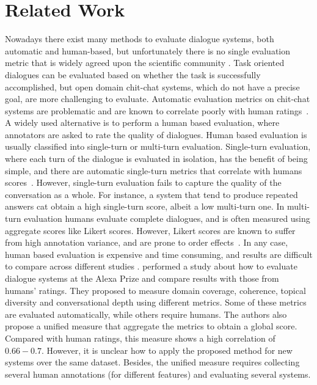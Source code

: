 \section{Related Work}
\label{sota}

Nowadays there exist many methods to evaluate dialogue systems, both automatic and human-based, but unfortunately there is no single evaluation metric that is widely agreed upon the scientific community \cite{deriu2019survey}. Task oriented dialogues can be evaluated based on whether the task is successfully accomplished, but open domain chit-chat systems, which do not have a precise goal, are more challenging to evaluate.
Automatic evaluation metrics on chit-chat systems are problematic and are known to correlate poorly with human ratings~\cite{liu-etal-2016-evaluate,lowe-etal-2017-towards}. 
A widely used alternative is to perform a human based evaluation, where annotators are asked to rate the quality of dialogues. Human based evaluation is usually classified into single-turn or multi-turn evaluation. Single-turn evaluation, where each turn of the dialogue is evaluated in isolation, has the benefit of being simple, and there are automatic single-turn metrics that correlate with humans scores~\cite{mehri2020usr}.
 However, single-turn evaluation fails to capture the quality of the conversation as a whole. For instance, a system that tend to produce repeated answers cat obtain a high single-turn score, albeit a low multi-turn one. In multi-turn evaluation humans evaluate complete dialogues, and is often measured using aggregate scores like Likert scores. 
However, Likert scores are known to suffer from high annotation variance, and are prone to order effects~\cite{amidei-etal-2019-use}. In any case, human based evaluation is expensive and time consuming, and results are difficult to compare across different studies \cite{van-der-lee-etal-2019-best,amidei2019agreement}. 
\citet{venkatesh2018evaluating} performed a study about how to evaluate dialogue systems at the Alexa Prize and compare results with those from humans' ratings. They proposed to measure domain coverage, coherence, topical diversity and conversational depth using different metrics. Some of these metrics are evaluated automatically, while others require humans. The authors also propose a unified measure that aggregate the metrics to obtain a global score. Compared with human ratings, this measure shows a high correlation of $0.66-0.7$. However, it is unclear how to apply the proposed method for new systems over the same dataset. Besides, the unified measure requires collecting several human annotations (for different features) and evaluating several systems.

